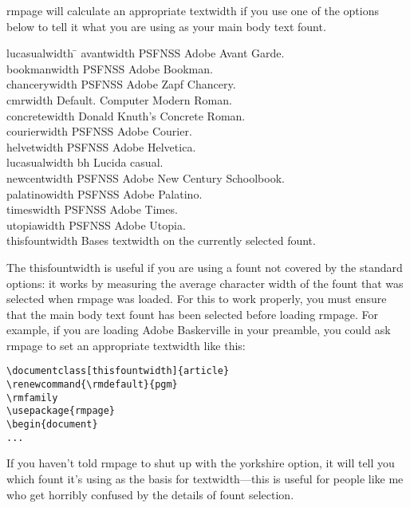 \documentclass[11pt,loose,twoside,touchwider,longish,
                      noheaders,a4paper,notstdmargins]{report}
\newcommand*{\packname}[1]{{\sffamily #1}}
\DeclareRobustCommand*{\comname}[1]{{\ttfamily\makeatletter\bs #1\makeatother}}
\newcommand*{\classname}[1]{{\ttfamily #1}}
\newcommand*{\optname}[1]{{\ttfamily #1}}
\newcommand*{\rmpage}{\classname{rmpage}\xspace}
\begin{document}
\rmpage will calculate an appropriate \comname{textwidth} if you use
one of the options below to tell it what you are using as your main
body text fount.
\begin{tabbing}
\optname{lucasualwidth}  \= \kill
\optname{avantwidth}     \> \packname{PSFNSS} Adobe Avant Garde. \\
\optname{bookmanwidth}   \> \packname{PSFNSS} Adobe Bookman. \\
\optname{chancerywidth}  \> \packname{PSFNSS} Adobe Zapf Chancery.\\
\optname{cmrwidth}       \> Default.  Computer Modern Roman. \\
\optname{concretewidth}  \> Donald Knuth's Concrete Roman. \\
\optname{courierwidth}   \> \packname{PSFNSS} Adobe Courier.  \\
\optname{helvetwidth}    \> \packname{PSFNSS} Adobe Helvetica.  \\
\optname{lucasualwidth}  \> \packname{bh} Lucida casual.  \\
\optname{newcentwidth}   \> \packname{PSFNSS} Adobe New Century Schoolbook. \\
\optname{palatinowidth}  \> \packname{PSFNSS} Adobe Palatino.  \\
\optname{timeswidth}     \> \packname{PSFNSS} Adobe Times.  \\
\optname{utopiawidth}    \> \packname{PSFNSS} Adobe Utopia.  \\
\optname{thisfountwidth} \> Bases \comname{textwidth} on the
currently selected fount.
\end{tabbing}
The \optname{thisfountwidth} is useful if you are using a fount not
covered by the standard options: it works by measuring the average
character width of the fount that was selected when \rmpage was
loaded.  For this to work properly, you must ensure that the main body
text fount has been selected before loading \rmpage.  For example, if
you are loading Adobe Baskerville in your preamble, you could ask
\rmpage to set an appropriate \comname{textwidth} like this:
\begin{verbatim}
\documentclass[thisfountwidth]{article}
\renewcommand{\rmdefault}{pgm}
\rmfamily
\usepackage{rmpage}
\begin{document}
...
\end{verbatim}
If you haven't told \rmpage to shut up with the \optname{yorkshire}
option, it will tell you which fount it's using as the basis for
\comname{textwidth}---this is useful for people like me who get
horribly confused by the details of fount selection.
\end{document}
